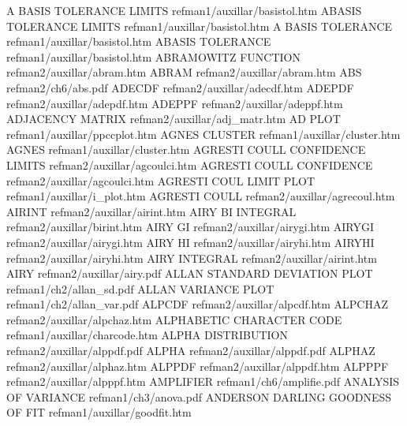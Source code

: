 A BASIS TOLERANCE LIMITS                refman1/auxillar/basistol.htm
ABASIS TOLERANCE LIMITS                 refman1/auxillar/basistol.htm
A BASIS TOLERANCE                       refman1/auxillar/basistol.htm
ABASIS TOLERANCE                        refman1/auxillar/basistol.htm
ABRAMOWITZ FUNCTION                     refman2/auxillar/abram.htm
ABRAM                                   refman2/auxillar/abram.htm
ABS                                     refman2/ch6/abs.pdf
ADECDF                                  refman2/auxillar/adecdf.htm
ADEPDF                                  refman2/auxillar/adepdf.htm
ADEPPF                                  refman2/auxillar/adeppf.htm
ADJACENCY MATRIX                        refman2/auxillar/adj_matr.htm
AD PLOT                                 refman1/auxillar/ppccplot.htm
AGNES CLUSTER                           refman1/auxillar/cluster.htm
AGNES                                   refman1/auxillar/cluster.htm
AGRESTI COULL CONFIDENCE LIMITS         refman2/auxillar/agcoulci.htm
AGRESTI COULL CONFIDENCE                refman2/auxillar/agcoulci.htm
AGRESTI COUL LIMIT PLOT                 refman1/auxillar/i_plot.htm
AGRESTI COULL                           refman2/auxillar/agrecoul.htm
AIRINT                                  refman2/auxillar/airint.htm
AIRY BI INTEGRAL                        refman2/auxillar/birint.htm
AIRY GI                                 refman2/auxillar/airygi.htm
AIRYGI                                  refman2/auxillar/airygi.htm
AIRY HI                                 refman2/auxillar/airyhi.htm
AIRYHI                                  refman2/auxillar/airyhi.htm
AIRY INTEGRAL                           refman2/auxillar/airint.htm
AIRY                                    refman2/auxillar/airy.pdf
ALLAN STANDARD DEVIATION PLOT           refman1/ch2/allan_sd.pdf
ALLAN VARIANCE PLOT                     refman1/ch2/allan_var.pdf
ALPCDF                                  refman2/auxillar/alpcdf.htm
ALPCHAZ                                 refman2/auxillar/alpchaz.htm
ALPHABETIC CHARACTER CODE               refman1/auxillar/charcode.htm
ALPHA DISTRIBUTION                      refman2/auxillar/alppdf.pdf
ALPHA                                   refman2/auxillar/alppdf.pdf
ALPHAZ                                  refman2/auxillar/alphaz.htm
ALPPDF                                  refman2/auxillar/alppdf.htm
ALPPPF                                  refman2/auxillar/alpppf.htm
AMPLIFIER                               refman1/ch6/amplifie.pdf
ANALYSIS OF VARIANCE                    refman1/ch3/anova.pdf
ANDERSON DARLING GOODNESS OF FIT        refman1/auxillar/goodfit.htm
